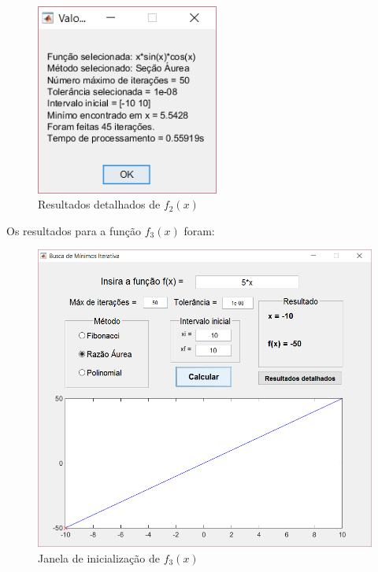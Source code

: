 \begin{figure}[h!]
	\begin{center}
		\includegraphics[width=6cm]{../aurea/f2_resultados.png}   
		\caption{Resultados detalhados de $ f_2(x) $}
		\label{fig:f2_resultados}
	\end{center}
\end{figure}

Os resultados para a função $ f_3(x) $ foram:

\begin{figure}[h]
	\begin{center}
		\includegraphics[width=14cm]{../aurea/f3_gui.png}   
		\caption{Janela de inicialização de $ f_3(x) $}
		\label{fig:f3_gui}
	\end{center}
\end{figure}

